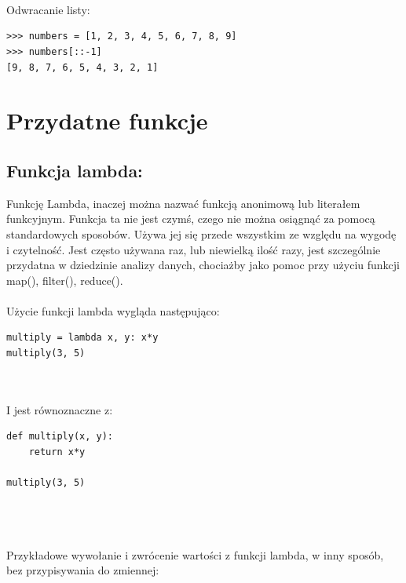 \documentclass[a4paper, 12pt]{article}
\begin{document}
\\ \\ \\
Odwracanie listy:
\\
\noindent\begin{minipage}{\linewidth}
\begin{lstlisting}[style=python]
>>> numbers = [1, 2, 3, 4, 5, 6, 7, 8, 9]
>>> numbers[::-1]
[9, 8, 7, 6, 5, 4, 3, 2, 1]
\end{lstlisting}
\end{minipage}

\section{Przydatne funkcje}

\subsection{Funkcja lambda:}

Funkcję Lambda, inaczej można nazwać funkcją anonimową lub literałem 
\\
funkcyjnym.
Funkcja ta nie jest czymś, czego nie można osiągnąć za pomocą standardowych sposobów. Używa jej się przede wszystkim ze względu na wygodę i czytelność. Jest często używana raz, lub niewielką ilość razy, jest szczególnie przydatna w dziedzinie analizy danych, chociażby jako pomoc przy użyciu funkcji map(), filter(), reduce().
\\ \\
Użycie funkcji lambda wygląda następująco:

\noindent\begin{minipage}{\linewidth}
\begin{lstlisting}[style=python]
multiply = lambda x, y: x*y
multiply(3, 5)
\end{lstlisting}
\end{minipage}
\\ \\
I jest równoznaczne z:


\noindent\begin{minipage}{\linewidth}
\begin{lstlisting}[style=python]
def multiply(x, y):
    return x*y
    
multiply(3, 5)
\end{lstlisting}
\end{minipage}
\\ \\ \\
Przykładowe wywołanie i zwrócenie wartości z funkcji lambda, w inny sposób, bez przypisywania do zmiennej:
\end{document}
